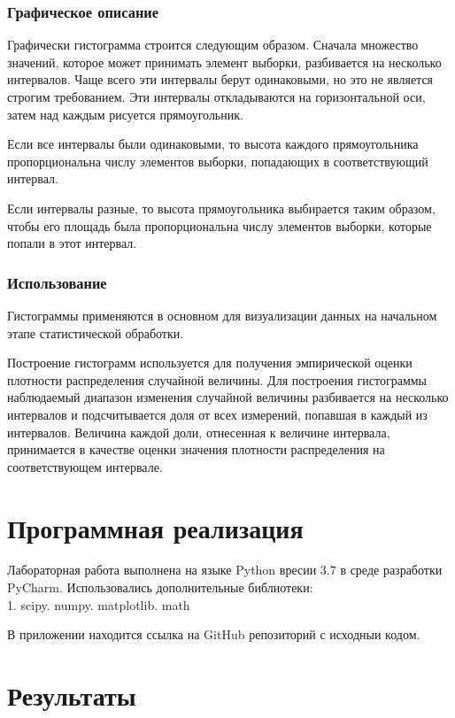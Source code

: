 \documentclass[a4paper]{article}
\begin{document}
	\subsubsection{Графическое описание}
	 Графически гистограмма строится следующим образом. Сначала множество значений, которое может принимать элемент выборки, разбивается на несколько интервалов. Чаще всего эти интервалы берут одинаковыми, но это не является строгим требованием. Эти интервалы откладываются на горизонтальной оси, затем над каждым рисуется прямоугольник. 
	 
	 Если все интервалы были одинаковыми, то высота каждого прямоугольника пропорциональна числу элементов выборки, попадающих в соответствующий интервал. 
	 
	 Если интервалы разные, то высота прямоугольника выбирается таким образом, чтобы его площадь была пропорциональна числу элементов выборки, которые попали в этот интервал.
	
	\subsubsection{Использование}
	 Гистограммы применяются в основном для визуализации данных на начальном этапе статистической обработки. 
	 
	 Построение гистограмм используется для получения эмпирической оценки плотности распределения случайной величины. Для построения гистограммы наблюдаемый диапазон изменения случайной величины разбивается на несколько интервалов и подсчитывается доля от всех измерений, попавшая в каждый из интервалов. Величина каждой доли, отнесенная к величине интервала, принимается в качестве оценки значения плотности распределения на соответствующем интервале.

\section {Программная реализация} 	
Лабораторная работа выполнена на языке Python вресии 3.7 в среде разработки PyCharm. Использовались дополнительные библиотеки:\\ 
1. scipy. numpy. matplotlib. math 

В приложении находится ссылка на GitHub репозиторий с исходныи кодом.

\section {Результаты} 
\end{document}
